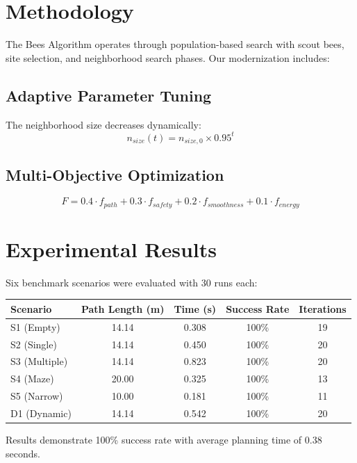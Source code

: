 \documentclass[10pt,a4paper]{article}
\begin{document}
\section{Methodology}

The Bees Algorithm operates through population-based search with scout bees, site selection, and neighborhood search phases. Our modernization includes:

\subsection{Adaptive Parameter Tuning}
The neighborhood size decreases dynamically:
\begin{equation}
n_{size}(t) = n_{size,0} \times 0.95^t
\end{equation}

\subsection{Multi-Objective Optimization}
\begin{equation}
F = 0.4 \cdot f_{path} + 0.3 \cdot f_{safety} + 0.2 \cdot f_{smoothness} + 0.1 \cdot f_{energy}
\end{equation}

\section{Experimental Results}

Six benchmark scenarios were evaluated with 30 runs each:

\begin{table}[h]
\centering
\begin{tabular}{|l|c|c|c|c|}
\hline
Scenario & Path Length (m) & Time (s) & Success Rate & Iterations \\
\hline
S1 (Empty) & 14.14 & 0.308 & 100\% & 19 \\
S2 (Single) & 14.14 & 0.450 & 100\% & 20 \\
S3 (Multiple) & 14.14 & 0.823 & 100\% & 20 \\
S4 (Maze) & 20.00 & 0.325 & 100\% & 13 \\
S5 (Narrow) & 10.00 & 0.181 & 100\% & 11 \\
D1 (Dynamic) & 14.14 & 0.542 & 100\% & 20 \\
\hline
\end{tabular}
\end{table}

Results demonstrate 100\% success rate with average planning time of 0.38 seconds.
\end{document}
